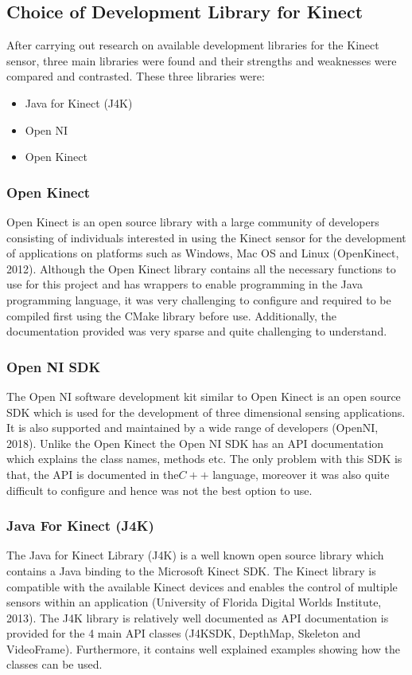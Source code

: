 \documentclass[a4paper, 12pt]{article}
\begin{document}
\subsection{Choice of Development Library for Kinect}

After carrying out research on available development libraries for the Kinect sensor, three main libraries were found and their strengths and weaknesses were compared and contrasted. These three libraries were: 

\begin{itemize}
	\item Java for Kinect (J4K)
	\item Open NI
	\item Open Kinect
\end{itemize}

\subsubsection{Open Kinect}
Open Kinect is an open source library with a large community of developers consisting of individuals interested in using the Kinect sensor for the development of applications on platforms such as Windows, Mac OS and Linux (OpenKinect, 2012). Although the Open Kinect library contains all the necessary functions to use for this project and has wrappers to enable programming in the Java programming language, it was very challenging to configure and required to be compiled first using the CMake library before use. Additionally, the documentation provided was very sparse and quite challenging to understand. 

\subsubsection{Open NI SDK}

The Open NI software development kit similar to Open Kinect is an open source SDK which is used for the development of three dimensional sensing applications. It is also supported and maintained by a wide range of developers (OpenNI, 2018). Unlike the Open Kinect the Open NI SDK has an API documentation which explains the class names, methods etc. The only problem with this SDK is that, the API is documented in the$C++$ language, moreover it was also quite difficult to configure and hence was not the best option to use. 
 
\subsubsection{Java For Kinect (J4K)}
The Java for Kinect Library (J4K) is a well known open source library which contains a Java binding to the Microsoft Kinect SDK. The Kinect library is compatible with the available Kinect devices and enables the control of multiple sensors within an application (University of Florida Digital Worlds Institute, 2013). The J4K library is relatively well documented as API documentation is provided for the 4 main API classes (J4KSDK, DepthMap, Skeleton and VideoFrame). Furthermore, it contains well explained examples showing how the classes can be used. 
\end{document}

